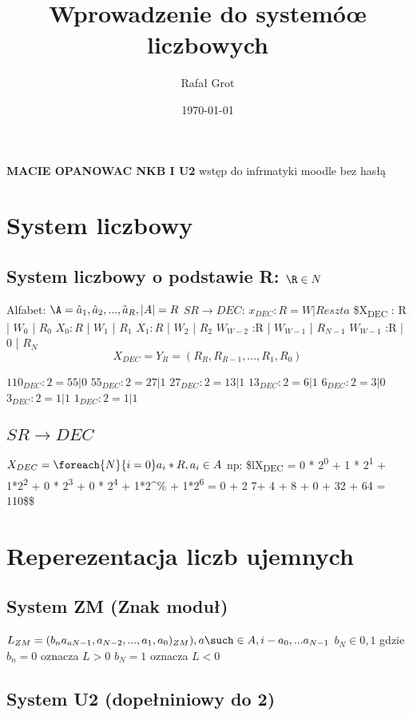 \documentclass[11pt]{article}
\author{Rafał Grot}
\date{\today}
\title{Wprowadzenie do systemóœ liczbowych}
\begin{document}
\maketitle
\tableofcontents

\textbf{MACIE OPANOWAC NKB I U2}
wstęp do infrmatyki moodle bez hasłą
\section{System liczbowy}
\label{sec:org03771cf}
\subsection{System liczbowy o podstawie R: \(\R \in N\)}
\label{sec:orgb421e36}
Alfabet: \(\A = {\hat{a}_1,\hat{a}_2,...,\hat{a}_R}, |A|=R\)
\(SR \to DEC\):
\(x_{DEC} : R = W | Reszta\)
\$X\textsubscript{DEC} : R | \(W_0\) | \(R_{0}\)
\(X_{0} :R\) | \(W_1\) | \(R_{1}\)
\(X_{1} :R\) | \(W_2\) | \(R_{2}\)
\(W_{W-2}\) :R | \(W_{W-1}\) | \(R_{N-1}\)
\(W_{W-1}\) :R | \(0\) | \(R_{N}\)
$$X_{DEC}=Y_R=(R_R, R_{R-1},...,R_1,R_0)$$

\(110_{DEC} : 2 = 55| 0\)
\(55_{DEC} : 2  = 27| 1\)
\(27_{DEC} : 2  = 13| 1\)
\(13_{DEC} : 2  = 6| 1\)
\(6_{DEC} : 2  = 3| 0\)
\(3_{DEC} : 2  = 1| 1\)
\(1_{DEC} : 2  = 1| 1\)

\subsection{\(SR \to DEC\)}
\label{sec:org56c9752}
\(X_{DEC} = \foreach{N}{i=0}a_i*R , a_i \in A\)
np:
\$lX\textsubscript{DEC} = 0 * 2\textsuperscript{0} + 1 * 2\textsuperscript{1} + 1*2\textsuperscript{2} + 0 * 2\textsuperscript{3} + 0 * 2\textsuperscript{4} + 1*2\^{}\% + 1*2\textsuperscript{6} = 0 + 2 7+ 4 + 8 + 0 + 32 + 64 = 110\$\$
\section{Reperezentacja liczb ujemnych}
\label{sec:org5bf9468}
\subsection{System ZM (Znak moduł)}
\label{sec:orgb7ea601}
\(L_{ZM} = (b_n a_{aN-1}, a_{N-2}, ... , a_{1}, a_0)_{ZM}), a\such \in A, i-a_0,...a_{N-1}\)
\(b_N \in {0,1}\) gdzie \(b_n=0\) oznacza \(L > 0\)
\(b_N=1\) oznacza \(L < 0\)
\subsection{System U2 (dopełniniowy do 2)}
\label{sec:org9c7bf30}
\end{document}
